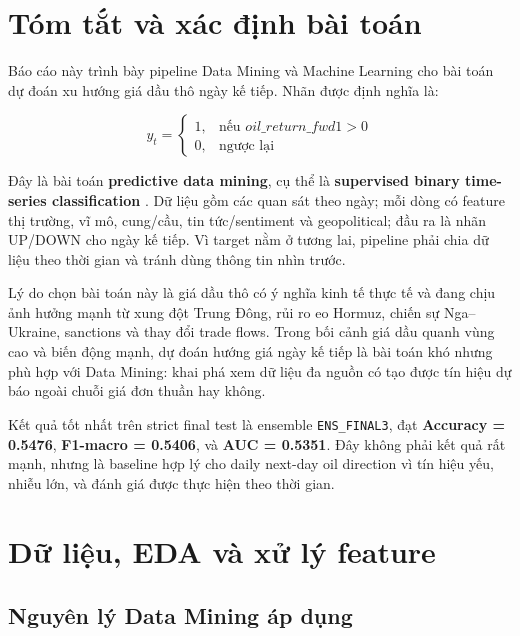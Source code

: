 \documentclass[10pt,a4paper]{article}
\newcommand{\code}[1]{\texttt{#1}}
\begin{document}
\tableofcontents
\clearpage
{}
\pagestyle{fancy}

\section{Tóm tắt và xác định bài toán}

Báo cáo này trình bày pipeline Data Mining và Machine Learning cho bài toán dự đoán xu hướng giá dầu thô ngày kế tiếp. Nhãn được định nghĩa là:

\[
y_t =
\begin{cases}
1, & \text{nếu } oil\_return\_fwd1 > 0 \\
0, & \text{ngược lại}
\end{cases}
\]

Đây là bài toán \textbf{predictive data mining}, cụ thể là \textbf{supervised binary time-series classification} \cite{han2012,hastie2009}. Dữ liệu gồm các quan sát theo ngày; mỗi dòng có feature thị trường, vĩ mô, cung/cầu, tin tức/sentiment và geopolitical; đầu ra là nhãn UP/DOWN cho ngày kế tiếp. Vì target nằm ở tương lai, pipeline phải chia dữ liệu theo thời gian và tránh dùng thông tin nhìn trước.

Lý do chọn bài toán này là giá dầu thô có ý nghĩa kinh tế thực tế và đang chịu ảnh hưởng mạnh từ xung đột Trung Đông, rủi ro eo Hormuz, chiến sự Nga--Ukraine, sanctions và thay đổi trade flows. Trong bối cảnh giá dầu quanh vùng cao và biến động mạnh, dự đoán hướng giá ngày kế tiếp là bài toán khó nhưng phù hợp với Data Mining: khai phá xem dữ liệu đa nguồn có tạo được tín hiệu dự báo ngoài chuỗi giá đơn thuần hay không.

Kết quả tốt nhất trên strict final test là ensemble \code{ENS\_FINAL3}, đạt \textbf{Accuracy = 0.5476}, \textbf{F1-macro = 0.5406}, và \textbf{AUC = 0.5351}. Đây không phải kết quả rất mạnh, nhưng là baseline hợp lý cho daily next-day oil direction vì tín hiệu yếu, nhiễu lớn, và đánh giá được thực hiện theo thời gian.

\section{Dữ liệu, EDA và xử lý feature}

\subsection{Nguyên lý Data Mining áp dụng}
\end{document}
